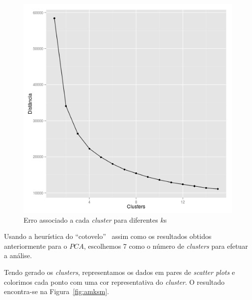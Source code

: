 \documentclass[10pt, conference, compsocconf]{IEEEtran}
\begin{document}
\begin{figure}[H]
  \centering
  \includegraphics[scale=0.4]{img/amv_kmdis.png}
  \caption{Erro associado a cada \textit{cluster} para diferentes $k$s}
  \label{fig:amkmdis}
\end{figure}

Usando a heurística do ``cotovelo''~\cite{thorndike1953belongs} assim
como os resultados obtidos anteriormente para o $PCA$, escolhemos 7
como o número de \textit{clusters} para efetuar a análise.

Tendo gerado os \textit{clusters}, representamos os dados em pares de
\textit{scatter plots} e colorimos cada ponto com uma cor
representativa do \textit{cluster}. O resultado encontra-se na
Figura~\ref{fig:amksm}.
\end{document}
